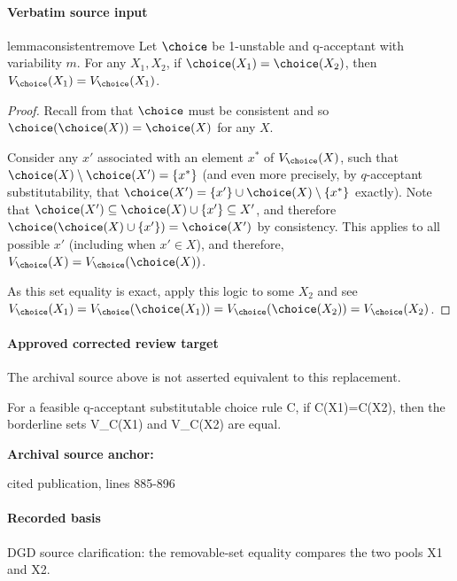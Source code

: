 \documentclass[10pt]{article}
\begin{document}
\paragraph{Verbatim source input}
\begin{ReviewVerbatim}
\begin{restatable}{lemma}{consistentremove}
\label{lem:consistent-remove}
Let $\choice$ be 1-unstable and q-acceptant with variability $m$. For any $X_1, X_2$, if $\choice(X_1) = \choice(X_2)$, then $V_\choice(X_1) = V_\choice(X_1)$.
\end{restatable}

\begin{proof}
Recall from  that $\choice$ must be consistent and so $\choice(\choice(X)) = \choice(X)$ for any $X$.

Consider any $x'$ associated with an element $x^*$ of $V_\choice(X)$, such that $\choice(X) \setminus \choice(X') = \{x^*\}$ (and even more precisely, by $q$-acceptant substitutability, that $\choice(X') = \{x'\} \cup \choice(X) \setminus \{x^*\}$ exactly). Note that $\choice(X') \subseteq \choice(X) \cup \{x'\} \subseteq X'$, and therefore $\choice(\choice(X) \cup \{x'\}) = \choice(X')$ by consistency. This applies to all possible $x'$ (including when $x' \in X$), and therefore, $V_\choice(X) = V_\choice(\choice(X))$.

As this set equality is exact, apply this logic to some $X_2$ and see $V_\choice(X_1) = V_\choice(\choice(X_1)) = V_\choice(\choice(X_2)) = V_\choice(X_2)$.
\end{proof}
\end{ReviewVerbatim}

\paragraph{Approved corrected review target}
The archival source above is not asserted equivalent to this replacement.
\begin{ReviewVerbatim}
For a feasible q-acceptant substitutable choice rule C, if C(X1)=C(X2), then the borderline sets V_C(X1) and V_C(X2) are equal.
\end{ReviewVerbatim}

\textbf{Archival source anchor:} {\footnotesize\raggedright cited publication, lines 885-\allowbreak{}896\par}
\paragraph{Recorded basis}
DGD source clarification:\allowbreak{} the removable-\allowbreak{}set equality compares the two pools X1 and X2.\allowbreak{}
\end{document}
